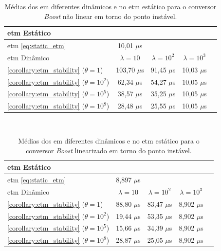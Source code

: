 \begin{table}[H]
  \centering
  \setlength{\tabcolsep}{10pt}
  \captionsetup{justification=centering}
  \begin{tabular}{lcccc}
    \toprule
      \acrshort{etm} Estático \\
    \midrule
      \acrshort{etm} \eqref{eq:static_etm} & 10,01 $\mu$s \\
    \bottomrule
    \toprule
    \acrshort{etm} Dinâmico & $\lambda = 10$ & $\lambda = 10^2$ & $\lambda = 10^3$ \\
    \midrule
      \autoref{corollary:etm_stability} ($\theta = 1$) & 103,70 $\mu$s & 91,45 $\mu$s &  10,03 $\mu$s   \\
      \autoref{corollary:etm_stability} ($\theta = 10^2$) & 62,34 $\mu$s & 54,27 $\mu$s & 10,05 $\mu$s\\
      \autoref{corollary:etm_stability} ($\theta = 10^5$) & 38,57 $\mu$s & 35,25 $\mu$s & 10,05 $\mu$s\\
      \autoref{corollary:etm_stability} ($\theta = 10^8$) & 28,48 $\mu$s & 25,55 $\mu$s & 10,05 $\mu$s\\
    \bottomrule
  \end{tabular} \\[4pt]
  \caption{Médias dos  em diferentes  dinâmicos e no \acrshort{etm} estático \newline para o conversor \textit{Boost }não linear em torno do ponto instável.}
  \label{table:dynamic_etm_approaches_boost_sl}
\end{table}

\begin{table}[H]
  \centering
  \setlength{\tabcolsep}{10pt}
  \captionsetup{justification=centering}
  \begin{tabular}{lcccc}
    \toprule
      \acrshort{etm} Estático \\
    \midrule
      \acrshort{etm} \eqref{eq:static_etm} & 8,897 $\mu$s \\
    \bottomrule
    \toprule
      \acrshort{etm} Dinâmico & $\lambda = 10$ & $\lambda = 10^2$ & $\lambda = 10^3$ \\
    \midrule
      \autoref{corollary:etm_stability} ($\theta = 1$) & 88,80 $\mu$s & 83,47 $\mu$s & 8,902 $\mu$s \\
      \autoref{corollary:etm_stability} ($\theta = 10^2$) & 19,44 $\mu$s & 53,35 $\mu$s & 8,902   $\mu$s\\
      \autoref{corollary:etm_stability} ($\theta = 10^5$) & 15,66 $\mu$s & 34,39 $\mu$s &  8,902 $\mu$s\\
      \autoref{corollary:etm_stability} ($\theta = 10^8$) & 28,87 $\mu$s & 25,05 $\mu$s & 8,902  $\mu$s\\
    \bottomrule
  \end{tabular} \\[4pt]
  \caption{Médias dos  em diferentes  dinâmicos e no \acrshort{etm} estático \newline para o conversor \textit{Boost }linearizado em torno do ponto instável.}
  \label{table:dynamic_etm_approaches_boost_snl}
\end{table}


